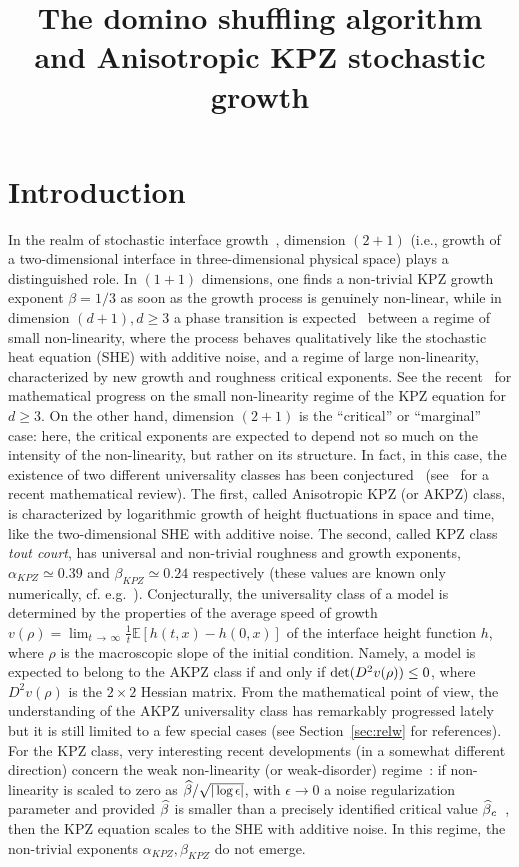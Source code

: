 \documentclass[AHL,Unicode,longabstracts,published]{cedram}
\title[Domino shuffling and stochastic growth]{The domino shuffling algorithm and Anisotropic KPZ stochastic growth}
\author[\initial{S.} \lastname{Chhita}]{\firstname{Sunil} \lastname{Chhita}}
\author[\initial{F.} \lastname{Toninelli}]{\firstname{Fabio} \lastname{Toninelli}}
\newcommand{\bbE}{\mathbb{E}}
\let\oldhat\hat
\renewcommand*{\hat}[1]{\mathchoice{\widehat{#1}}{\widehat{#1}}{\oldhat{#1}}{\oldhat{#1}}}
\begin{document}
\maketitle

\section{Introduction}
In the realm of stochastic interface growth~\cite{BS95}, dimension $(2+1)$ (i.e., growth of a two-dimensional interface in three-dimensional physical space) plays a distinguished role. In $(1+1)$ dimensions, one finds a non-trivial KPZ growth exponent $\beta=1/3$ as soon as the growth process is genuinely non-linear, while in dimension $(d+1),d\ge3$ a phase transition is expected~\cite{KPZ86} between a regime of small non-linearity, where the process behaves qualitatively like the stochastic heat equation (SHE) with additive noise, and a regime of large non-linearity, characterized by new growth and roughness critical exponents. See the recent~\cite{comets2019renormalizing,dunlap2018fluctuations,magnen2018scaling} for mathematical progress on the small non-linearity regime of the KPZ equation for $d\ge3$. On the other hand, dimension $(2+1)$ is the ``critical'' or ``marginal'' case: here, the critical exponents are expected to depend not so much on the intensity of the non-linearity, but rather on its structure. In fact, in this case, the existence of two different universality classes has been conjectured~\cite{BS95,Wol91} (see~\cite{toninelli20173+} for a recent mathematical review). The first, called Anisotropic KPZ (or AKPZ) class, is characterized by logarithmic growth of height fluctuations in space and time, like the two-dimensional SHE with additive noise. The second, called KPZ class \emph{tout court}, has universal and non-trivial roughness and growth exponents, $\alpha_{KPZ}\simeq 0.39$ and $\beta_{KPZ}\simeq 0.24$ respectively (these values are known only numerically, cf. e.g.~\cite{HH12,TFW92}). Conjecturally, the universality class of a model is determined by the properties of the average speed of growth $v(\rho)=\lim_{t\,\to\,\infty}\frac1t\bbE[h(t,x)-h(0,x)]$ of the interface height function $h$, where $\rho$ is the macroscopic slope of the initial condition. Namely, a model is expected to belong to the AKPZ class if and only if $\det(D^2 v(\rho))\linebreak\le 0$, where $D^2 v(\rho)$ is the $2\times 2$ Hessian matrix. From the mathematical point of view, the understanding of the AKPZ universality class has remarkably progressed lately but it is still limited to a few special cases (see Section~\ref{sec:relw} for references). For the KPZ class, very interesting recent developments (in a somewhat different direction) concern the weak non-linearity (or weak-disorder) regime~\cite{chatterjee2018constructing,caravenna2018two}: if non-linearity is scaled to zero as $\hat \beta/\sqrt{\text{\small{$|\log\epsilon|$}}}$, with $\epsilon\to0$ a noise regularization parameter and provided $\hat \beta$ is smaller than a precisely identified critical value $\hat \beta_c$~\cite{caravenna2018two}, then the KPZ equation scales to the SHE with additive noise. In this regime, the non-trivial exponents $\alpha_{KPZ},\beta_{KPZ}$ do not emerge.
\end{document}
